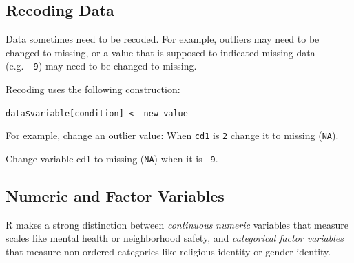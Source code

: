 \documentclass[
  letterpaper,
  DIV=11,
  numbers=noendperiod]{scrreprt}
\newenvironment{Shaded}{\begin{snugshade}}{\end{snugshade}}
\newcommand{\CommentTok}[1]{\textcolor[rgb]{0.37,0.37,0.37}{#1}}
\newcommand{\ConstantTok}[1]{\textcolor[rgb]{0.56,0.35,0.01}{#1}}
\newcommand{\DecValTok}[1]{\textcolor[rgb]{0.68,0.00,0.00}{#1}}
\newcommand{\NormalTok}[1]{\textcolor[rgb]{0.00,0.23,0.31}{#1}}
\newcommand{\OtherTok}[1]{\textcolor[rgb]{0.00,0.23,0.31}{#1}}
\newcommand{\SpecialCharTok}[1]{\textcolor[rgb]{0.37,0.37,0.37}{#1}}
\begin{document}
\hypertarget{recoding-data}{%
\subsection{Recoding Data}\label{recoding-data}}

Data sometimes need to be recoded. For example, outliers may need to be
changed to missing, or a value that is supposed to indicated missing
data (e.g.~\texttt{-9}) may need to be changed to missing.

Recoding uses the following construction:

\texttt{data\$variable{[}condition{]}\ \textless{}-\ new\ value}

For example, change an outlier value: When \texttt{cd1} is \texttt{2}
change it to missing (\texttt{NA}).

\begin{Shaded}
\end{Shaded}

Change variable cd1 to missing (\texttt{NA}) when it is \texttt{-9}.

\begin{Shaded}
\end{Shaded}

\hypertarget{numeric-and-factor-variables}{%
\subsection{Numeric and Factor
Variables}\label{numeric-and-factor-variables}}

R makes a strong distinction between \emph{continuous} \emph{numeric}
variables that measure scales like mental health or neighborhood safety,
and \emph{categorical} \emph{factor variables} that measure non-ordered
categories like religious identity or gender identity.
\end{document}
